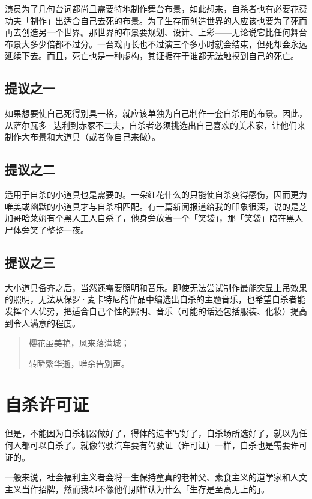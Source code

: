 \documentclass[UTF8]{ctexart}
\begin{document}
演员为了几句台词都尚且需要特地制作舞台布景，如此想来，自杀者也有必要花费功夫「制作」出适合自己去死的布景。为了生存而创造世界的人应该也要为了死而再去创造另一个世界。那世界的布景要规划、设计、上彩——无论说它比任何舞台布景大多少倍都不过分。一台戏再长也不过演三个多小时就会结束，但死却会永远延续下去。而且，死亡也是一种虚构，其证据在于谁都无法触摸到自己的死亡。

\subsection{提议之一}

如果想要使自己死得别具一格，就应该单独为自己制作一套自杀用的布景。因此，从萨尔瓦多·达利到赤冢不二夫，自杀者必须挑选出自己喜欢的美术家，让他们来制作大布景和大道具（或者你自己来做）。

\subsection{提议之二}

适用于自杀的小道具也是需要的。一朵红花什么的只能使自杀变得感伤，因而更为唯美或幽默的小道具才与自杀相匹配。有一篇新闻报道给我的印象很深，说的是芝加哥哈莱姆有个黑人工人自杀了，他身旁放着一个「笑袋」，那「笑袋」陪在黑人尸体旁笑了整整一夜。

\subsection{提议之三}

大小道具备齐之后，当然还需要照明和音乐。即使无法尝试制作最能突显上吊效果的照明，无法从保罗·麦卡特尼的作品中编选出自杀的主题音乐，也希望自杀者能发挥个人优势，把适合自己个性的照明、音乐（可能的话还包括服装、化妆）提高到令人满意的程度。


\begin{verse}
樱花虽美艳，风来落满城；

转瞬繁华逝，唯余告别声。
\end{verse}

\section{自杀许可证}

但是，不能因为自杀机器做好了，得体的遗书写好了，自杀场所选好了，就以为任何人都可以自杀了。就像驾驶汽车要有驾驶证（许可证）一样，自杀也是需要许可证的。

一般来说，社会福利主义者会将一生保持童真的老神父、素食主义的道学家和人文主义当作招牌，然而我却不像他们那样认为什么「生存是至高无上的」。
\end{document}
